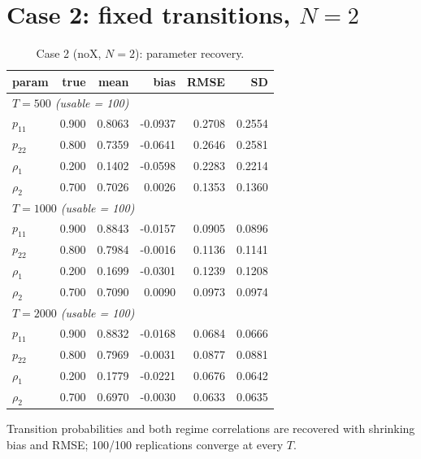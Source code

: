 \documentclass[11pt]{article}
\begin{document}
\section{Case 2: fixed transitions, $N = 2$}
\begin{table}[!htbp]\centering\small
\caption{Case 2 (noX, $N=2$): parameter recovery.}\label{tab:c2}
\begin{tabular}{lrrrrr}
\toprule
param & true & mean & bias & RMSE & SD\\
\midrule\multicolumn{6}{l}{\emph{$T = 500$ (usable = 100)}}\\
$p_{11}$ & 0.900 & 0.8063 & -0.0937 & 0.2708 & 0.2554\\
$p_{22}$ & 0.800 & 0.7359 & -0.0641 & 0.2646 & 0.2581\\
$\rho_1$ & 0.200 & 0.1402 & -0.0598 & 0.2283 & 0.2214\\
$\rho_2$ & 0.700 & 0.7026 & 0.0026 & 0.1353 & 0.1360\\
\midrule\multicolumn{6}{l}{\emph{$T = 1000$ (usable = 100)}}\\
$p_{11}$ & 0.900 & 0.8843 & -0.0157 & 0.0905 & 0.0896\\
$p_{22}$ & 0.800 & 0.7984 & -0.0016 & 0.1136 & 0.1141\\
$\rho_1$ & 0.200 & 0.1699 & -0.0301 & 0.1239 & 0.1208\\
$\rho_2$ & 0.700 & 0.7090 & 0.0090 & 0.0973 & 0.0974\\
\midrule\multicolumn{6}{l}{\emph{$T = 2000$ (usable = 100)}}\\
$p_{11}$ & 0.900 & 0.8832 & -0.0168 & 0.0684 & 0.0666\\
$p_{22}$ & 0.800 & 0.7969 & -0.0031 & 0.0877 & 0.0881\\
$\rho_1$ & 0.200 & 0.1779 & -0.0221 & 0.0676 & 0.0642\\
$\rho_2$ & 0.700 & 0.6970 & -0.0030 & 0.0633 & 0.0635\\
\bottomrule
\end{tabular}
\end{table}
Transition probabilities and both regime correlations are recovered with
shrinking bias and RMSE; 100/100 replications converge at every $T$.
\end{document}
